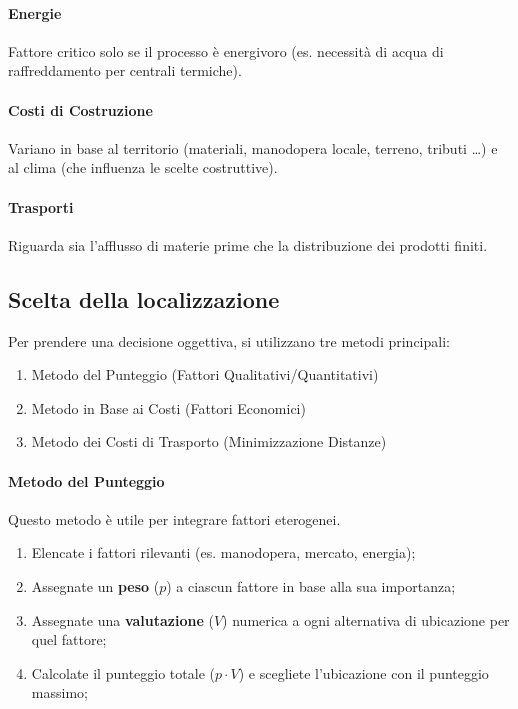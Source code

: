 \paragraph{Energie} Fattore critico solo se il processo è energivoro (es. necessità di acqua di raffreddamento per centrali termiche).
%
\paragraph{Costi di Costruzione} Variano in base al territorio (materiali, manodopera locale, terreno, tributi \dots) e al clima (che influenza le scelte costruttive).
%
\paragraph{Trasporti} Riguarda sia l'afflusso di materie prime che la distribuzione dei prodotti finiti.
%
\subsection{Scelta della localizzazione}
Per prendere una decisione oggettiva, si utilizzano tre metodi principali:
\begin{enumerate}[label=\alph*)] %
    \item Metodo del Punteggio (Fattori Qualitativi/Quantitativi)
    \item Metodo in Base ai Costi (Fattori Economici)
    \item Metodo dei Costi di Trasporto (Minimizzazione Distanze)
\end{enumerate} %
%
\paragraph{Metodo del Punteggio} Questo metodo è utile per integrare fattori eterogenei.
\begin{enumerate}
    \item Elencate i fattori rilevanti (es. manodopera, mercato, energia);
    \item Assegnate un \textbf{peso} ($p$) a ciascun fattore in base alla sua importanza;
    \item Assegnate una \textbf{valutazione} ($V$) numerica a ogni alternativa di ubicazione per quel fattore;
    \item Calcolate il punteggio totale ($p \cdot V$) e scegliete l'ubicazione con il punteggio massimo;
\end{enumerate}
%
